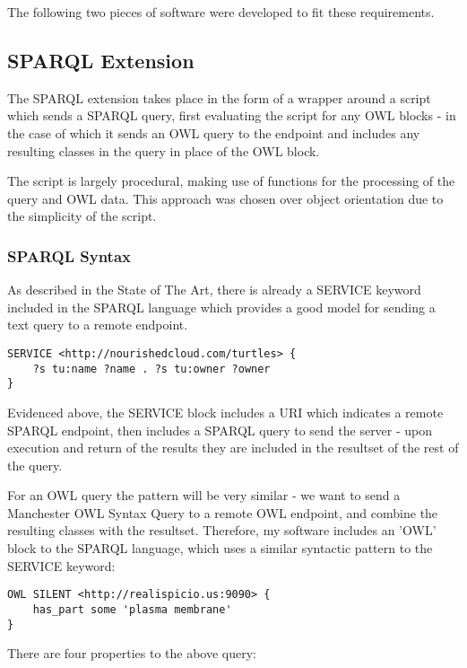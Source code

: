 \documentclass{article}
\begin{document}
The following two pieces of software were developed to fit these requirements.

\subsection{SPARQL Extension}

The SPARQL extension takes place in the form of a wrapper around a script which
sends a SPARQL query, first evaluating the script for any OWL blocks - in the
case of which it sends an OWL query to the endpoint and includes any resulting
classes in the query in place of the OWL block.

The script is largely procedural, making use of functions for the processing of
the query and OWL data. This approach was chosen over object orientation due to
the simplicity of the script.

\subsubsection{SPARQL Syntax}

As described in the State of The Art, there is already a SERVICE keyword
included in the SPARQL language which provides a good model for sending a text
query to a remote endpoint. 

\begin{lstlisting}
SERVICE <http://nourishedcloud.com/turtles> { 
    ?s tu:name ?name . ?s tu:owner ?owner
}
\end{lstlisting}

Evidenced above, the SERVICE block includes a URI which indicates a remote
SPARQL endpoint, then includes a SPARQL query to send the server - upon
execution and return of the results they are included in the resultset of the
rest of the query.

For an OWL query the pattern will be very similar - we want to send a Manchester
OWL Syntax Query to a remote OWL endpoint, and combine the resulting classes
with the resultset. Therefore, my software includes an 'OWL' block to the SPARQL 
language, which uses a similar syntactic pattern to the SERVICE keyword:

\begin{lstlisting}
OWL SILENT <http://realispicio.us:9090> {
    has_part some 'plasma membrane'
}
\end{lstlisting}

There are four properties to the above query:
\end{document}
